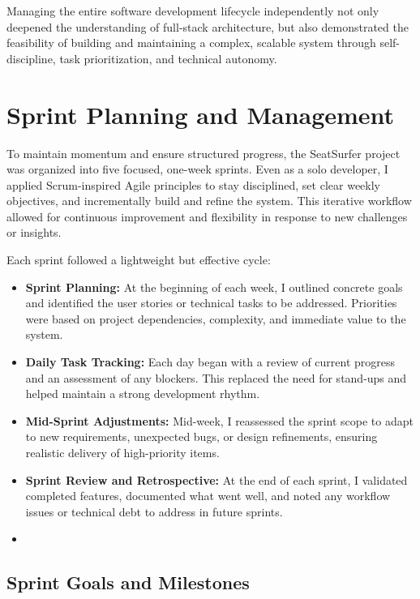 \documentclass[12pt,a4paper]{report}
\begin{document}
Managing the entire software development lifecycle independently not only deepened the understanding of full-stack architecture, but also demonstrated the feasibility of building and maintaining a complex, scalable system through self-discipline, task prioritization, and technical autonomy.

\section{Sprint Planning and Management}

To maintain momentum and ensure structured progress, the SeatSurfer project was organized into five focused, one-week sprints. Even as a solo developer, I applied Scrum-inspired Agile principles to stay disciplined, set clear weekly objectives, and incrementally build and refine the system. This iterative workflow allowed for continuous improvement and flexibility in response to new challenges or insights.

Each sprint followed a lightweight but effective cycle:

\begin{itemize}
\item \textbf{Sprint Planning:} At the beginning of each week, I outlined concrete goals and identified the user stories or technical tasks to be addressed. Priorities were based on project dependencies, complexity, and immediate value to the system.
\item \textbf{Daily Task Tracking:} Each day began with a review of current progress and an assessment of any blockers. This replaced the need for stand-ups and helped maintain a strong development rhythm.

\item \textbf{Mid-Sprint Adjustments:} Mid-week, I reassessed the sprint scope to adapt to new requirements, unexpected bugs, or design refinements, ensuring realistic delivery of high-priority items.

\item \textbf{Sprint Review and Retrospective:} At the end of each sprint, I validated completed features, documented what went well, and noted any workflow issues or technical debt to address in future sprints.
\item \end{itemize}

\subsection*{Sprint Goals and Milestones}
\end{document}
